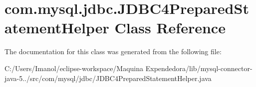 \hypertarget{classcom_1_1mysql_1_1jdbc_1_1_j_d_b_c4_prepared_statement_helper}{}\section{com.\+mysql.\+jdbc.\+J\+D\+B\+C4\+Prepared\+Statement\+Helper Class Reference}
\label{classcom_1_1mysql_1_1jdbc_1_1_j_d_b_c4_prepared_statement_helper}


The documentation for this class was generated from the following file\+:\begin{DoxyCompactItemize}
\item 
C\+:/\+Users/\+Imanol/eclipse-\/workspace/\+Maquina Expendedora/lib/mysql-\/connector-\/java-\/5../src/com/mysql/jdbc/J\+D\+B\+C4\+Prepared\+Statement\+Helper.\+java\end{DoxyCompactItemize}
